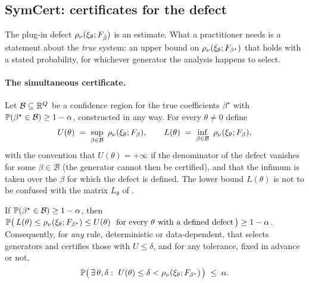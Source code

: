 \subsection{SymCert: certificates for the defect}
\label{sec:method}

The plug-in defect $\rho_\nu(\xi_\theta; F_{\hat{\beta}})$ is an estimate. What a
practitioner needs is a statement about the \emph{true} system: an upper bound
on $\rho_\nu(\xi_\theta; F_{\beta^\star})$ that holds with a stated
probability, for whichever generator the analysis happens to select.

\paragraph{The simultaneous certificate.} Let $\mathcal B \subseteq \mathbb{R}^Q$ be a
confidence region for the true coefficients $\beta^\star$ with
$\mathbb{P}(\beta^\star \in \mathcal B) \ge 1-\alpha$, constructed in any way. For
every $\theta \neq 0$ define
\begin{equation}
  U(\theta) \;=\; \sup_{\beta \in \mathcal B}\ \rho_\nu(\xi_\theta; F_\beta),
  \qquad
  L(\theta) \;=\; \inf_{\beta \in \mathcal B}\ \rho_\nu(\xi_\theta; F_\beta),
  \label{eq:U}
\end{equation}
with the convention that $U(\theta) = +\infty$ if the denominator of the defect
vanishes for some $\beta \in \mathcal B$ (the generator cannot then be
certified), and that the infimum is taken over the $\beta$ for which the defect
is defined. The lower bound $L(\theta)$ is not to be confused with the matrix
$L_\theta$ of .

\begin{proposition}
\label{prop:simultaneous}
If $\mathbb{P}(\beta^\star \in \mathcal B) \ge 1-\alpha$, then
$\mathbb{P}\bigl(\, L(\theta) \le \rho_\nu(\xi_\theta;F_{\beta^\star}) \le
U(\theta) \ \text{ for every } \theta \text{ with a defined defect} \,\bigr) \ge
1-\alpha$. Consequently, for \emph{any} rule, deterministic or data-dependent,
that selects generators and certifies those with $U \le \delta$, and for any
tolerance, fixed in advance or not,
\begin{equation}
  \Prob\bigl(\, \exists\, \theta, \delta:\ U(\theta) \le \delta < \defect_\nu(\xi_\theta;F_{\beta^\star}) \,\bigr) \;\le\; \alpha .
  \label{eq:fwer}
\end{equation}
\end{proposition}

